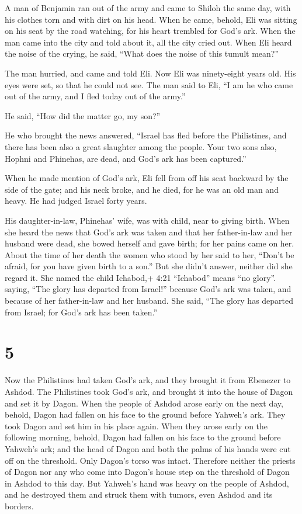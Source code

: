  A man of Benjamin ran out of the army and came to Shiloh
the same day, with his clothes torn and with dirt on his head.
 When he came, behold, Eli was sitting on his seat by the
road watching, for his heart trembled for God's ark. When the man came
into the city and told about it, all the city cried out. 
When Eli heard the noise of the crying, he said, ``What does the noise
of this tumult mean?''

The man hurried, and came and told Eli.  Now Eli was
ninety-eight years old. His eyes were set, so that he could not see.
 The man said to Eli, ``I am he who came out of the army,
and I fled today out of the army.''

He said, ``How did the matter go, my son?''

 He who brought the news answered, ``Israel has fled before
the Philistines, and there has been also a great slaughter among the
people. Your two sons also, Hophni and Phinehas, are dead, and God's ark
has been captured.''

 When he made mention of God's ark, Eli fell from off his
seat backward by the side of the gate; and his neck broke, and he died,
for he was an old man and heavy. He had judged Israel forty years.

 His daughter-in-law, Phinehas' wife, was with child, near
to giving birth. When she heard the news that God's ark was taken and
that her father-in-law and her husband were dead, she bowed herself and
gave birth; for her pains came on her.  About the time of
her death the women who stood by her said to her, ``Don't be afraid, for
you have given birth to a son.'' But she didn't answer, neither did she
regard it.  She named the child Ichabod,+ 4:21 ``Ichabod''
means ``no glory''. saying, ``The glory has departed from Israel!''
because God's ark was taken, and because of her father-in-law and her
husband.  She said, ``The glory has departed from Israel;
for God's ark has been taken.''

\hypertarget{section-4}{%
\section{5}\label{section-4}}

 Now the Philistines had taken God's ark, and they brought
it from Ebenezer to Ashdod.  The Philistines took God's ark,
and brought it into the house of Dagon and set it by Dagon. 
When the people of Ashdod arose early on the next day, behold, Dagon had
fallen on his face to the ground before Yahweh's ark. They took Dagon
and set him in his place again.  When they arose early on
the following morning, behold, Dagon had fallen on his face to the
ground before Yahweh's ark; and the head of Dagon and both the palms of
his hands were cut off on the threshold. Only Dagon's torso was intact.
 Therefore neither the priests of Dagon nor any who come
into Dagon's house step on the threshold of Dagon in Ashdod to this day.
 But Yahweh's hand was heavy on the people of Ashdod, and he
destroyed them and struck them with tumors, even Ashdod and its borders.

